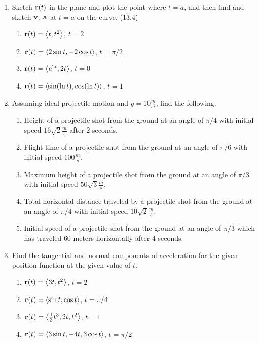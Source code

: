 \begin{enumerate}
    \item Sketch $\mathbf{r}(t)$ in the plane and plot the point where $t=a$, and then find and sketch $\mathbf{v}$, $\mathbf{a}$ at $t=a$ on the curve. (13.4)

      \begin{enumerate}
        \item $\mathbf{r}(t) = \left<t, t^2\right>$, $t=2$
        \item $\mathbf{r}(t) = \left<2\sin t,-2\cos t\right>$, $t=\pi/2$
        \item $\mathbf{r}(t) = \left<e^{2t},2t\right>$, $t=0$
        \item $\mathbf{r}(t) = \left<\sin(\ln t),\cos(\ln t)\right>$, $t=1$
      \end{enumerate}

    \item Assuming ideal projectile motion and $g=10\frac{m}{s^2}$, find the following.

      \begin{enumerate}
        \item Height of a projectile shot from the ground at an angle of $\pi/4$ with initial speed $16\sqrt{2}\frac{m}{s}$ after $2$ seconds.
        \item Flight time of a projectile shot from the ground at an angle of $\pi/6$ with initial speed $100\frac{m}{s}$.
        \item Maximum height of a projectile shot from the ground at an angle of $\pi/3$ with initial speed $50\sqrt{3}\frac{m}{s}$.
        \item Total horizontal distance traveled by a projectile shot from the ground at an angle of $\pi/4$ with initial speed $10\sqrt{2}\frac{m}{s}$.
        \item Initial speed of a projectile shot from the ground at an angle of $\pi/3$ which has traveled $60$ meters horizontally after $4$ seconds.
      \end{enumerate}

    \newpage

    \item Find the tangential and normal components of acceleration for the given position function at the given value of $t$.

      \begin{enumerate}
        \item $\mathbf{r}(t) = \left<3t,t^2\right>$, $t=2$
        \item $\mathbf{r}(t) = \left<\sin t, \cos t\right>$, $t=\pi/4$
        \item $\mathbf{r}(t) = \left<\frac{1}{3}t^3,2t,t^2\right>$, $t=1$
        \item $\mathbf{r}(t) = \left< 3\sin t, -4t, 3\cos t \right>$, $t=\pi/2$
      \end{enumerate}


\end{enumerate}
